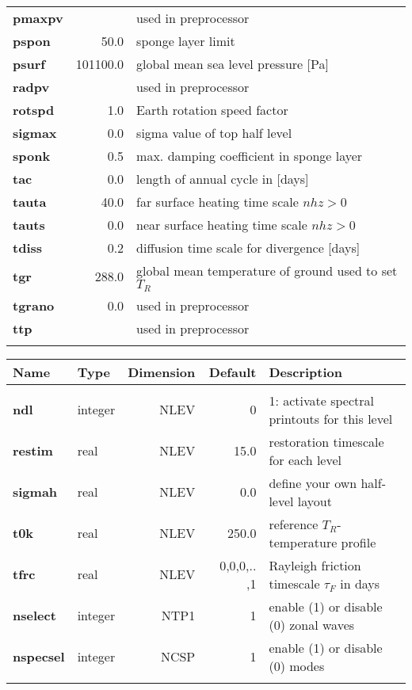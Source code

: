 \begin{tabular}{|l|r||l|}
{\bf pmaxpv } &      & used in preprocessor \\
{\bf pspon  } & 50.0 & sponge layer limit \\
{\bf psurf  } & 101100.0 & global mean sea level pressure [Pa] \\
{\bf radpv  } &      & used in preprocessor \\
{\bf rotspd } &  1.0 & Earth rotation speed factor \\
{\bf sigmax } &  0.0 & sigma value of top half level \\
{\bf sponk  } &  0.5 & max. damping coefficient in sponge layer \\
{\bf tac    } &  0.0 & length of annual cycle in [days] \\
{\bf tauta  } & 40.0 & far surface heating time scale $nhz > 0$ \\
{\bf tauts  } &  0.0 & near surface heating time scale $nhz > 0$ \\
{\bf tdiss  } &  0.2 & diffusion time scale for divergence [days] \\
{\bf tgr    } & 288.0 & global mean temperature of ground used to set $T_R$ \\ 
{\bf tgrano } & 0.0  & used in preprocessor \\
{\bf ttp    } &      & used in preprocessor \\
& & \\
\hline
\end{tabular}

\begin{tabular}{|l|l|r|r||l|}                                  
\hline
Name   & Type & Dimension & Default & Description \\
\hline
& & & & \\
{\bf ndl      } & integer & NLEV & 0 & 1: activate spectral printouts for this level \\
{\bf restim   } & real    & NLEV & 15.0 & restoration timescale for each level \\ 
{\bf sigmah   } & real    & NLEV &  0.0 & define your own half-level layout \\
{\bf t0k      } & real    & NLEV & 250.0 & reference $T_R$-temperature profile \\ 
{\bf tfrc     } & real    & NLEV & 0,0,0,.. ,1 & Rayleigh friction timescale $\tau_F$ in days \\
{\bf nselect  } & integer & NTP1 &  1 & enable (1) or disable (0) zonal waves \\
{\bf nspecsel } & integer & NCSP &  1 & enable (1) or disable (0) modes \\
& & & & \\
\hline                                                        
\end{tabular}
